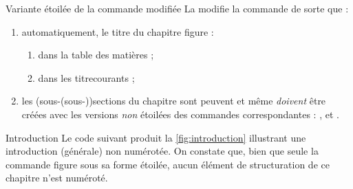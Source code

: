 
\begin{dbremark}{Variante étoilée de la commande \protect{} modifiée}{}
  La \yatcl{} modifie la commande  de sorte que :
  \begin{enumerate}
  \item automatiquement, le titre du chapitre figure :
    \begin{enumerate}
    \item dans la table des matières ;
    \item dans les \glspl{titrecourant} ;
    \end{enumerate}
  \item les (sous-(sous-))sections du chapitre sont peuvent et même
    \emph{doivent} être créées avec les versions \emph{non} étoilées des
    commandes correspondantes : ,
     et .
  \end{enumerate}
\end{dbremark}

\begin{dbexample}{Introduction}{}
  Le code suivant produit la \vref{fig:introduction} illustrant une
  introduction (générale) non numérotée. On constate que, bien que seule la
  commande  figure sous sa forme étoilée, aucun élément
  de structuration de ce chapitre n'est numéroté.
\end{dbexample}

